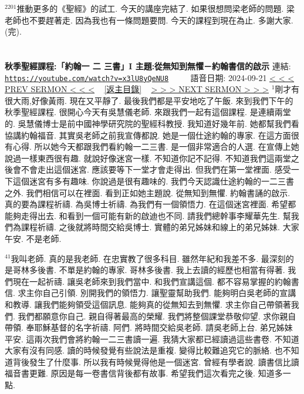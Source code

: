 \documentclass{book}
\begin{document}
$^{2201}$推動更多的《聖經》的試工.
今天的講座完結了.
如果很想問梁老師的問題.
梁老師也不要趕著走.
因為我也有一條問題要問.
今天的課程到現在為止.
多謝大家.
(完).
\newpage



\section{}
\label{sec:x3lU8yQeNU8}
\textbf{秋季聖經課程:「約翰一 二 三書」I 主題:從無知到無懼－約翰書信的啟示}
\newline
\newline
連結: \href{https://youtube.com/watch?v=x3lU8yQeNU8}{\texttt{https://youtube.com/watch?v=x3lU8yQeNU8}} ~~~~ 語音日期: 2024-09-21
\newline
\newline
\hyperref[sec:A6e_76MEqBA]{\small{< < < PREV SERMON < < <}}
~
\hyperref[sec:index]{\small{[返主目錄]}}
~
\hyperref[sec:sEvrhOW5UYA]{\small{> > > NEXT SERMON > > >}}
\newline
\newline
$^{1}$剛才有很大雨,好像黃雨.
現在又平靜了.
最後我們都是平安地吃了午飯.
來到我們下午的秋季聖經課程.
很開心今天有吳慧儀老師.
來跟我們一起有這個課程.
是連續兩堂的.
吳慧儀博士是前中國神學研究院的聖經科教授.
我知道好幾年前.
她都幫我們看協講約翰福音.
其實吳老師之前我宣傳都說.
她是一個仕途約翰的專家.
在這方面很有心得.
所以她今天都跟我們看約翰一二三書.
是一個非常適合的人選.
在宣傳上她說過一樣東西很有趣.
就說好像迷宮一樣.
不知道你記不記得.
不知道我們這兩堂之後會不會走出這個迷宮.
應該要等下一堂才會走得出.
但我們在第一堂裡面.
感受一下這個迷宮有多有趣味.
你說過是很有趣味的.
我們今天認識仕途約翰的一二三書之外.
我們相信可以在裡面.
看到正如她主題說.
從無知到無懼.
約翰書誦的啟示.
真的要為課程祈禱.
為吳博士祈禱.
為我們有一個領悟力.
在這個迷宮裡面.
希望都能夠走得出去.
和看到一個可能有新的啟迪也不同.
請我們總幹事李耀華先生.
幫我們為課程祈禱.
之後就將時間交給吳博士.
實體的弟兄姊妹和線上的弟兄姊妹.
大家午安.
不是老師.

$^{41}$我叫老師.
真的是我老師.
在忠實教了很多科目.
雖然年紀和我差不多.
最深刻的是哥林多後書.
不單是約翰的專家.
哥林多後書.
我上去讀的經歷也相當有得著.
我們現在一起祈禱.
讓吳老師來到我們當中.
和我們宣講這個.
都不容易掌握的約翰書信.
求主你自己引領.
別開我們的領悟力.
讓聖靈幫助我們.
能夠明白吳老師的宣講和教導.
讓我們能夠領受這個訊息.
能夠真的從無知去到無懼.
求主你自己帶領著我們.
我們都願意你自己.
親自得著最高的榮耀.
我們將整個課堂恭敬仰望.
求你親自帶領.
奉耶穌基督的名字祈禱.
阿們.
將時間交給吳老師.
請吳老師上台.
弟兄姊妹平安.
這兩次我們會將約翰一二三書讀一遍.
我猜大家都已經讀過這些書卷.
不知道大家有沒有同感.
讀的時候發覺有些說法是重複.
變得比較難追究它的脈絡.
也不知道背後發生了什麼事.
所以我有時候覺得他是一個迷宮.
曾經有學者說.
讀書信比讀福音書更難.
原因是每一卷書信背後都有故事.
希望我們這次看完之後.
知道多一點.
\end{document}
